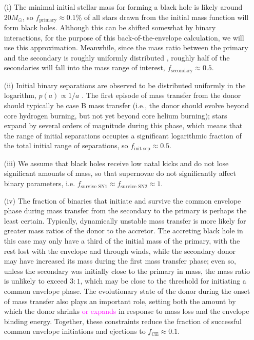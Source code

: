\documentclass[iop,onecolumn]{revtex4}
\newcommand{\ilya}[1]{\textcolor{magenta}{#1}}
\begin{document}
\begin{enumerate}
	\item[(i)] The minimal initial stellar mass for forming a black hole is likely around $20 M_\odot$, so $f_\textrm{primary} \approx 0.1\%$ of all stars drawn from the \citet{Kroupa:2002} initial mass function will form black holes. Although this can be shifted somewhat by binary interactions, for the purpose of this back-of-the-envelope calculation, we will use this approximation. Meanwhile, since the mass ratio between the primary and the secondary is roughly uniformly distributed \citep{Sana:2012,MoeDiStefano:2017}, roughly half of the secondaries will fall into the mass range of interest, $f_\textrm{secondary} \approx 0.5$.  

\item[(ii)] Initial binary  separations are observed to be distributed uniformly in the logarithm, $p(a) \propto 1/a$ \citep{Opik:1924}.  The first episode of mass transfer from the donor should typically be case B mass transfer (i.e., the donor should evolve beyond core hydrogen burning, but not yet beyond core helium burning); stars expand by several orders of magnitude during this phase, which means that the range of initial separations occupies a significant logarithmic fraction of the total initial range of separations, so $f_\textrm{init sep} \approx 0.5$.  

\item[(iii)]  We assume that black holes receive low natal kicks and do not lose significant amounts of mass, so that supernovae do not significantly affect binary parameters, i.e. $f_\textrm{survive SN1} \approx f_\textrm{survive SN2} \approx 1$.  

\item[(iv)] The fraction of binaries that initiate and survive the common envelope phase during mass transfer from the secondary to the primary is perhaps the least certain.  Typically, dynamically unstable mass transfer is more likely for greater mass ratios of the donor to the accretor.  The accreting black hole in this case may only have a third of the initial mass of the primary, with the rest lost with the envelope and through winds, while the secondary donor may have increased its mass during the first mass transfer phase; even so, unless the secondary was initially close to the primary in mass, the mass ratio is unlikely to exceed $3:1$, which may be close to the threshold for initiating a common envelope phase.  The evolutionary state of the donor during the onset of mass transfer also plays an important role, setting both the amount by which the donor shrinks \ilya{or expands} in response to mass loss and the envelope binding energy.  Together, these constraints reduce the fraction of successful common envelope initiations and ejections to $f_\textrm{CE} \approx 0.1$.  


\end{enumerate}
\end{document}
